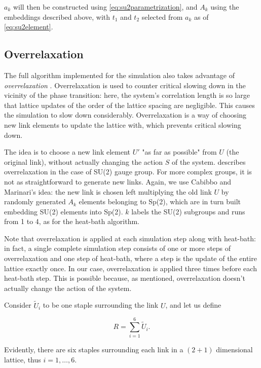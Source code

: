 \documentclass[reqno,12pt]{article}
\numberwithin{equation}{section}
\begin{document}
$a_k$ will then be constructed using \eqref{eq:su2parametrization}, and $A_k$ using the embeddings described
above, with $t_1$ and $t_2$ selected from $a_k$ as of \eqref{eq:su2element}.

\subsection{Overrelaxation}

The full algorithm implemented for the simulation also takes advantage of \textit{overrelaxation} \cite{montvay}.
Overrelaxation is used to counter critical slowing down in the vicinity of the phase transition: here,
the system's correlation length is so large that lattice updates of the order of the lattice spacing are
negligible. This causes the simulation to slow down considerably. 
Overrelaxation is a way of choosing new link elements to update the lattice with, which prevents critical
slowing down. 

The idea is to choose a new link element $U'$ "as far as possible" from $U$ (the original link), without actually changing the
action $S$ of the system. \cite{montvay} describes overrelaxation in the case of SU(2) gauge group. For more
complex groups, it is not as straightforward to generate new links. Again, we use Cabibbo and Marinari's idea:
the new link is chosen left multiplying the old link $U$ by randomly generated $A_k$ elements belonging
to Sp(2), which are in turn built embedding SU(2) elements into Sp(2). $k$ labels the SU(2) subgroups and runs
from 1 to 4, as for the heat-bath algorithm. 

Note that overrelaxation is applied at each simulation step along with heat-bath: in fact,
a single complete simulation step consists of one or more steps of overrelaxation and one step of heat-bath, where
a step is the update of the entire lattice exactly once. In our case, overrelaxation is applied three times
before each heat-bath step. This is possible because, as mentioned, overrelaxation doesn't actually change
the action of the system.

Consider $\widetilde{U}_i$ to be one staple surrounding the link $U$, and let us define

\begin{equation}
	R = \sum_{i = 1}^6 \widetilde{U}_i.
\end{equation}

Evidently, there are six staples surrounding each link in a $(2+1)$ dimensional lattice, thus $i = 1,\dots,6$.
\end{document}
